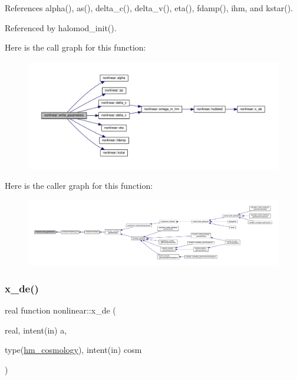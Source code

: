 References alpha(), as(), delta\+\_\+c(), delta\+\_\+v(), eta(), fdamp(), ihm, and kstar().



Referenced by halomod\+\_\+init().

Here is the call graph for this function\+:
\nopagebreak
\begin{figure}[H]
\begin{center}
\leavevmode
\includegraphics[width=350pt]{namespacenonlinear_abd2adda1e3c0e77617e1142893c4aa71_cgraph}
\end{center}
\end{figure}
Here is the caller graph for this function\+:
\nopagebreak
\begin{figure}[H]
\begin{center}
\leavevmode
\includegraphics[width=350pt]{namespacenonlinear_abd2adda1e3c0e77617e1142893c4aa71_icgraph}
\end{center}
\end{figure}
\mbox{\label{namespacenonlinear_a316db4addf8f1f544ab3c08ba97fbeb9}} 
\subsubsection{\texorpdfstring{x\+\_\+de()}{x\_de()}}
{\footnotesize\ttfamily real function nonlinear\+::x\+\_\+de (\begin{DoxyParamCaption}\item[{real, intent(in)}]{a,  }\item[{type(\mbox{\hyperlink{structnonlinear_1_1hm__cosmology}{hm\+\_\+cosmology}}), intent(in)}]{cosm }\end{DoxyParamCaption})\hspace{0.3cm}{\ttfamily [private]}}



